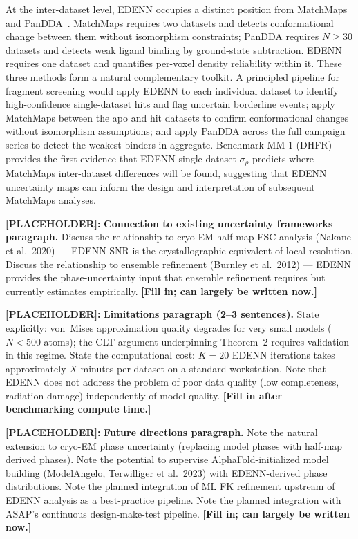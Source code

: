 \documentclass[10pt,twocolumn]{article}
\newcommand{\placeholder}[1]{%
  \begin{mdframed}[
    linecolor=placeholder,linewidth=1pt,
    backgroundcolor=red!5,
    innertopmargin=6pt,innerbottommargin=6pt,
    innerleftmargin=8pt,innerrightmargin=8pt]
  \small\color{placeholder}\textbf{[PLACEHOLDER]:} #1
  \end{mdframed}
}
\begin{document}
At the inter-dataset level, EDENN occupies a distinct position
from MatchMaps~\cite{brookner2023} and PanDDA~\cite{pearce2017}.
MatchMaps requires two datasets and detects conformational change
between them without isomorphism constraints; PanDDA requires
$N \geq 30$ datasets and detects weak ligand binding by
ground-state subtraction.
EDENN requires one dataset and quantifies per-voxel density
reliability within it.
These three methods form a natural complementary toolkit.
A principled pipeline for fragment screening would apply EDENN to
each individual dataset to identify high-confidence single-dataset
hits and flag uncertain borderline events; apply MatchMaps between
the apo and hit datasets to confirm conformational changes without
isomorphism assumptions; and apply PanDDA across the full campaign
series to detect the weakest binders in aggregate.
Benchmark MM-1 (DHFR) provides the first evidence that EDENN
single-dataset $\sigma_\rho$ predicts where MatchMaps
inter-dataset differences will be found, suggesting that EDENN
uncertainty maps can inform the design and interpretation of
subsequent MatchMaps analyses.

\placeholder{
\textbf{Connection to existing uncertainty frameworks paragraph.}
Discuss the relationship to cryo-EM half-map FSC analysis
(Nakane et al.\ 2020) --- EDENN SNR is the crystallographic
equivalent of local resolution.
Discuss the relationship to ensemble refinement (Burnley et al.\
2012) --- EDENN provides the phase-uncertainty input that ensemble
refinement requires but currently estimates empirically.
\textbf{[Fill in; can largely be written now.]}
}

\placeholder{
\textbf{Limitations paragraph (2--3 sentences).}
State explicitly: von~Mises approximation quality degrades for very
small models ($N < 500$ atoms); the CLT argument underpinning
Theorem~2 requires validation in this regime.
State the computational cost: $K=20$ EDENN iterations takes
approximately $X$ minutes per dataset on a standard workstation.
Note that EDENN does not address the problem of poor data quality
(low completeness, radiation damage) independently of model quality.
\textbf{[Fill in after benchmarking compute time.]}
}

\placeholder{
\textbf{Future directions paragraph.}
Note the natural extension to cryo-EM phase uncertainty
(replacing model phases with half-map derived phases).
Note the potential to supervise AlphaFold-initialized model
building (ModelAngelo, Terwilliger et al.\ 2023) with
EDENN-derived phase distributions.
Note the planned integration of ML FK refinement upstream of
EDENN analysis as a best-practice pipeline.
Note the planned integration with ASAP's continuous
design-make-test pipeline.
\textbf{[Fill in; can largely be written now.]}
}
\end{document}
